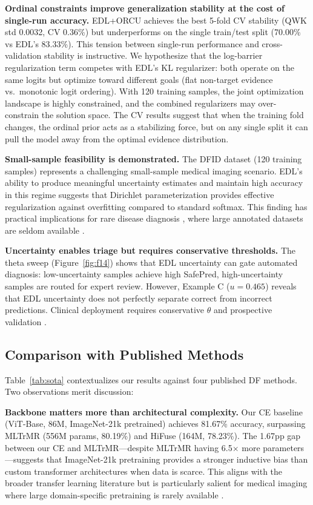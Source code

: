 \textbf{Ordinal constraints improve generalization stability at the cost of single-run accuracy.} EDL+ORCU achieves the best 5-fold CV stability (QWK std 0.0032, CV 0.36\%) but underperforms on the single train/test split (70.00\% vs EDL's 83.33\%). This tension between single-run performance and cross-validation stability is instructive. We hypothesize that the log-barrier regularization term competes with EDL's KL regularizer: both operate on the same logits but optimize toward different goals (flat non-target evidence vs.\ monotonic logit ordering). With 120 training samples, the joint optimization landscape is highly constrained, and the combined regularizers may over-constrain the solution space. The CV results suggest that when the training fold changes, the ordinal prior acts as a stabilizing force, but on any single split it can pull the model away from the optimal evidence distribution.

\textbf{Small-sample feasibility is demonstrated.} The DFID dataset (120 training samples) represents a challenging small-sample medical imaging scenario. EDL's ability to produce meaningful uncertainty estimates and maintain high accuracy in this regime suggests that Dirichlet parameterization provides effective regularization against overfitting compared to standard softmax. This finding has practical implications for rare disease diagnosis \cite{xie2024fewshot}, where large annotated datasets are seldom available \cite{zhang2023dentalai}.

\textbf{Uncertainty enables triage but requires conservative thresholds.} The theta sweep (Figure~\ref{fig:f14}) shows that EDL uncertainty can gate automated diagnosis: low-uncertainty samples achieve high SafePred, high-uncertainty samples are routed for expert review. However, Example C ($u=0.465$) reveals that EDL uncertainty does not perfectly separate correct from incorrect predictions. Clinical deployment requires conservative $\theta$ and prospective validation \cite{abdar2021uncertainty}.

\subsection{Comparison with Published Methods}

Table~\ref{tab:sota} contextualizes our results against four published DF methods. Two observations merit discussion:

\textbf{Backbone matters more than architectural complexity.} Our CE baseline (ViT-Base, 86M, ImageNet-21k pretrained) achieves 81.67\% accuracy, surpassing MLTrMR (556M params, 80.19\%) and HiFuse (164M, 78.23\%). The 1.67pp gap between our CE and MLTrMR---despite MLTrMR having 6.5$\times$ more parameters---suggests that ImageNet-21k pretraining provides a stronger inductive bias than custom transformer architectures when data is scarce. This aligns with the broader transfer learning literature \cite{raghu2019transfusion} but is particularly salient for medical imaging where large domain-specific pretraining is rarely available \cite{xie2024fewshot}.

